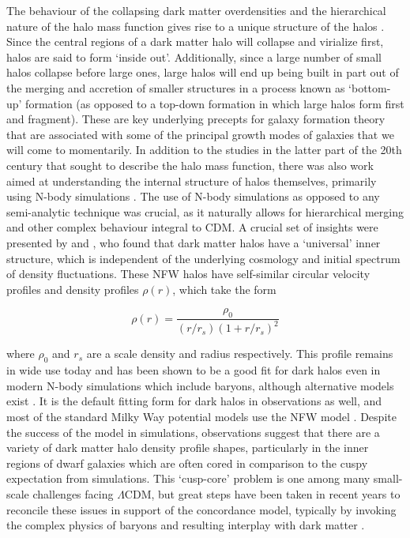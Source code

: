 The behaviour of the collapsing dark matter overdensities and the hierarchical nature of the halo mass function gives rise to a unique structure of the halos \parencite[e.g.][]{frenk85,frenk88}. Since the central regions of a dark matter halo will collapse and virialize first, halos are said to form `inside out'. Additionally, since a large number of small halos collapse before large ones, large halos will end up being built in part out of the merging and accretion of smaller structures in a process known as `bottom-up' formation (as opposed to a top-down formation in which large halos form first and fragment). These are key underlying precepts for galaxy formation theory that are associated with some of the principal growth modes of galaxies that we will come to momentarily. In addition to the studies in the latter part of the 20th century that sought to describe the halo mass function, there was also work aimed at understanding the internal structure of halos themselves, primarily using N-body simulations \parencite[e.g.][]{efstathiou88,dubinski91}. The use of N-body simulations as opposed to any semi-analytic technique was crucial, as it naturally allows for hierarchical merging and other complex behaviour integral to CDM. A crucial set of insights were presented by \textcite{navarro96} and \textcite{navarro97}, who found that dark matter halos have a `universal' inner structure, which is independent of the underlying cosmology and initial spectrum of density fluctuations. These NFW halos have self-similar circular velocity profiles and density profiles $\rho(r)$, which take the form

\begin{equation}
    \label{ch1:eq:nfw}
    \rho(r) = \frac{\rho_{0}}{(r/r_{s})(1 + r/r_{s})^{2}}
\end{equation}

\noindent where $\rho_{0}$ and $r_{s}$ are a scale density and radius respectively. This profile remains in wide use today and has been shown to be a good fit for dark halos even in modern N-body simulations which include baryons, although alternative models exist \parencite[e.g.][]{einasto65}. It is the default fitting form for dark halos in observations as well, and most of the standard Milky Way potential models use the NFW model \parencite[e.g.][]{bovy15,mcmillan17}. Despite the success of the model in simulations, observations suggest that there are a variety of dark matter halo density profile shapes, particularly in the inner regions of dwarf galaxies which are often cored in comparison to the cuspy expectation from simulations. This `cusp-core' problem \parencite[see][for a summary]{bullock17} is one among many small-scale challenges facing $\Lambda$CDM, but great steps have been taken in recent years to reconcile these issues in support of the concordance model, typically by invoking the complex physics of baryons and resulting interplay with dark matter \parencite[see][for a recent perspective]{sales22}.

